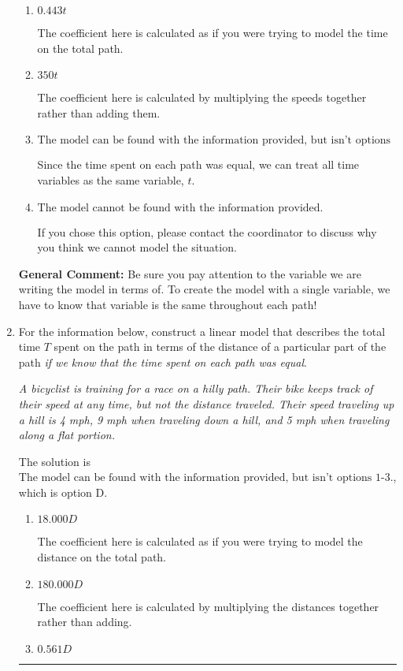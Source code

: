 \documentclass{extbook}[14pt]
\newcommand{\litem}[1]{\item #1

\rule{\textwidth}{0.4pt}}
\begin{document}
\begin{enumerate}
{\begin{enumerate}[label=\Alph*.]
* This is the correct option since time spent on each path is equal.
\item \( 0.443 t \)

The coefficient here is calculated as if you were trying to model the time on the total path.
\item \( 350 t \)

The coefficient here is calculated by multiplying the speeds together rather than adding them.
\item \( \text{The model can be found with the information provided, but isn't options 1-3.} \)

Since the time spent on each path was equal, we can treat all time variables as the same variable, $t$.
\item \( \text{The model cannot be found with the information provided.} \)

If you chose this option, please contact the coordinator to discuss why you think we cannot model the situation.
\end{enumerate}

\textbf{General Comment:} Be sure you pay attention to the variable we are writing the model in terms of. To create the model with a single variable, we have to know that variable is the same throughout each path!
}
\litem{
For the information below, construct a linear model that describes the total time $T$ spent on the path in terms of the distance of a particular part of the path \textit{if we know that the time spent on each path was equal}.

\begin{center}
    \textit{ A bicyclist is training for a race on a hilly path. Their bike keeps track of their speed at any time, but not the distance traveled. Their speed traveling up a hill is 4 mph, 9 mph when traveling down a hill, and 5 mph when traveling along a flat portion. }
\end{center}
The solution is \( \text{The model can be found with the information provided, but isn't options 1-3.} \), which is option D.\begin{enumerate}[label=\Alph*.]
\item \( 18.000 D \)

The coefficient here is calculated as if you were trying to model the distance on the total path.
\item \( 180.000 D \)

The coefficient here is calculated by multiplying the distances together rather than adding.
\item \( 0.561 D \)


\end{enumerate}}
\end{enumerate}
\end{document}
